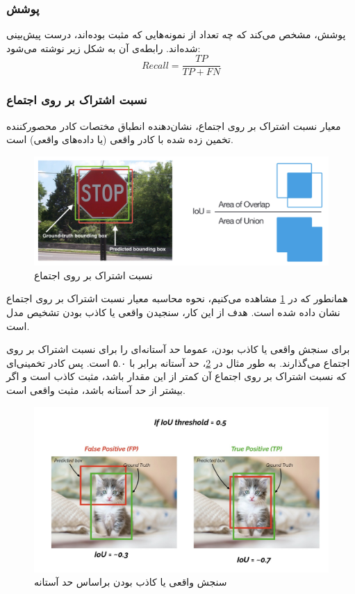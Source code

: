 \subsubsection{پوشش}
پوشش، مشخص می‌کند که چه تعداد از نمونه‌هایی که مثبت بوده‌اند، درست پیش‌بینی شده‌اند. رابطه‌ی آن به شکل زیر نوشته می‌شود:
\begin{equation}
    Recall = \dfrac{TP}{TP+FN}
\end{equation}

\subsubsection{نسبت اشتراک بر روی اجتماع}
معیار نسبت اشتراک بر روی اجتماع، نشان‌دهنده انطباق مختصات کادر محصورکننده تخمین زده شده با کادر واقعی (یا داده‌های واقعی) است.

\begin{figure}[h!]
    \centering
    \includegraphics[width=0.8\linewidth]{figures/IoU.png}
    \caption{نسبت اشتراک بر روی اجتماع \cite{V7:mAP_Explanation}}
    \label{fig:IoU}
\end{figure}

همانطور که در \cref{fig:IoU} مشاهده می‌کنیم، نحوه محاسبه معیار نسبت اشتراک بر روی اجتماع نشان داده شده است. هدف از این کار، سنجیدن واقعی یا کاذب بودن تشخیص مدل است.

برای سنجش واقعی یا کاذب بودن، عموما حد آستانه‌ای را برای نسبت اشتراک بر روی اجتماع می‌گذارند. به طور مثال در \cref{fig:IoU_FP_TP}، حد آستانه برابر با ۵.۰ است. پس کادر تخمینی‌ای که نسبت اشتراک بر روی اجتماع آن کمتر از این مقدار باشد، مثبت کاذب است و اگر بیشتر از حد آستانه باشد، مثبت واقعی است.

\begin{figure}[h!]
    \centering
    \includegraphics[width=0.8\linewidth]{figures/IoU_FP_TP.png}
    \caption{سنجش واقعی یا کاذب بودن براساس حد آستانه \cite{V7:mAP_Explanation}}
    \label{fig:IoU_FP_TP}
\end{figure}

